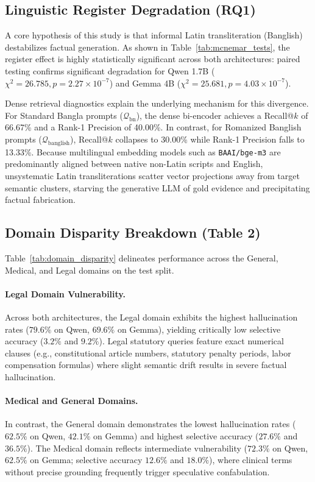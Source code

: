 \subsection{Linguistic Register Degradation (RQ1)}
A core hypothesis of this study is that informal Latin transliteration (Banglish) destabilizes factual generation. As shown in Table~\ref{tab:mcnemar_tests}, the register effect is highly statistically significant across both architectures: paired testing confirms significant degradation for Qwen 1.7B ($\chi^2 = 26.785, p = 2.27 \times 10^{-7}$) and Gemma 4B ($\chi^2 = 25.681, p = 4.03 \times 10^{-7}$). 

Dense retrieval diagnostics explain the underlying mechanism for this divergence. For Standard Bangla prompts ($\mathcal{Q}_{\text{bn}}$), the dense bi-encoder achieves a Recall@$k$ of 66.67\% and a Rank-1 Precision of 40.00\%. In contrast, for Romanized Banglish prompts ($\mathcal{Q}_{\text{banglish}}$), Recall@$k$ collapses to 30.00\% while Rank-1 Precision falls to 13.33\%. Because multilingual embedding models such as \texttt{BAAI/bge-m3} are predominantly aligned between native non-Latin scripts and English, unsystematic Latin transliterations scatter vector projections away from target semantic clusters, starving the generative LLM of gold evidence and precipitating factual fabrication.

\subsection{Domain Disparity Breakdown (Table 2)}
Table~\ref{tab:domain_disparity} delineates performance across the General, Medical, and Legal domains on the test split.



\paragraph{Legal Domain Vulnerability.} Across both architectures, the Legal domain exhibits the highest hallucination rates ($79.6\%$ on Qwen, $69.6\%$ on Gemma), yielding critically low selective accuracy ($3.2\%$ and $9.2\%$). Legal statutory queries feature exact numerical clauses (e.g., constitutional article numbers, statutory penalty periods, labor compensation formulas) where slight semantic drift results in severe factual hallucination.
\paragraph{Medical and General Domains.} In contrast, the General domain demonstrates the lowest hallucination rates ($62.5\%$ on Qwen, $42.1\%$ on Gemma) and highest selective accuracy ($27.6\%$ and $36.5\%$). The Medical domain reflects intermediate vulnerability ($72.3\%$ on Qwen, $62.5\%$ on Gemma; selective accuracy $12.6\%$ and $18.0\%$), where clinical terms without precise grounding frequently trigger speculative confabulation.

